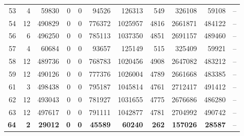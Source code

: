 \documentclass[conference,twoside]{IEEEtran}
\begin{document}
\begin{table}[!htbp]
\begin{tabular}{rrrrrrrrrrr}
53 &  4 & 59830 & 0 & 0 & 94526 & 126313 & 549 & 326108 & 59108& -- \\
54 & 12  & 490829 & 0 & 0 & 776372 & 1025957 & 4816 & 2661871 & 484122& -- \\
56 & 6  & 496250 & 0 & 0 & 785113 & 1037350 & 4851 & 2691157 & 489460& -- \\
57 &  4 & 60684 & 0 & 0 & 93657 & 125149 & 515 & 325409 & 59921& -- \\
58 & 12  & 489736 & 0 & 0 & 768783 & 1020456 & 4908 & 2647082 & 483212& -- \\
59 &  12 & 490126 & 0 & 0 & 777376 & 1026004 & 4789 & 2661668 & 483385& -- \\
61 & 3  & 498438 & 0 & 0 & 795187 & 1045814 & 4761 & 2712417 & 491412& -- \\
62 & 12  & 493043 & 0 & 0 & 781927 & 1031655 & 4775 & 2676686 & 486280& -- \\
63 & 12  & 497617 & 0 & 0 & 791111 & 1042877 & 4781 & 2704992 & 490742& -- \\
\textbf{64} &  \textbf{2} & \textbf{29012} & \textbf{0} & \textbf{0} & \textbf{45589} & \textbf{60240} & \textbf{262} & \textbf{157026} &\textbf{ 28587}& -- \\
\bottomrule
\end{tabular}
\end{table}
\end{document}
